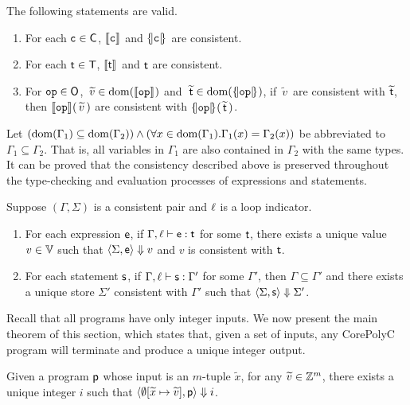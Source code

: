 \documentclass[runningheads]{llncs}
\begin{document}
\begin{lemma}\label{lem:map}
The following statements are valid.
\begin{enumerate}
    \item For each $\c\in\C$, $\smap{\c}{}$ and $\tmap{\c}{}$ are consistent.
    \item For each $\tt\in\T$, $\smap{\tt}{}$ and $\tt$ are consistent.
    \item For $\op\in\O$, $\,\widetilde{v}\in\dom(\smap{\op}{})$ and $\;\widetilde{\tt}\in\dom(\tmap{\op}{})$, if $\,\widetilde{v}\,$ are consistent with $\widetilde{\tt}$, then $\smap{\op}{}(\,\widetilde{v}\,)$ are consistent with $\tmap{\op}{}(\,\widetilde{\tt}\,)$.
\end{enumerate}
\end{lemma}


Let $\left(\dom(\Gamma_1)\subseteq\dom(\Gamma_2)\right) \wedge \left(\forall x\in\dom(\Gamma_1). \Gamma_1(x)=\Gamma_2(x)\right)$ be abbreviated to $\Gamma_1\subseteq\Gamma_2$.
That is, all variables in $\Gamma_1$ are also contained in $\Gamma_2$ with the same types.
It can be proved that the consistency described above is preserved throughout the type-checking and evaluation processes of expressions and statements.

\begin{lemma}
Suppose $(\Gamma,\Sigma)$ is a consistent pair and $\l$ is a loop indicator.
\begin{enumerate}
    \item For each expression $\e$, if $\typing{\Gamma}{\l}{\e}{\tt}$ for some $\tt$, there exists a unique value $v\in\V$ such that $\semantics{\Sigma}{\e}{v}$ and $v$ is consistent with $\tt$.
    \item For each statement $\s$, if $\typing{\Gamma}{\l}{\s}{\Gamma'}$ for some $\Gamma'$, then $\Gamma\subseteq\Gamma'$ and there exists a unique store $\Sigma'$ consistent with $\Gamma'$ such that $\semantics{\Sigma}{\s}{\Sigma'}$.
\end{enumerate}
\label{lem:preservation}
\end{lemma}

Recall that all programs have only integer inputs.
We now present the main theorem of this section, which states that, given a set of inputs, any CorePolyC program will terminate and produce a unique integer output.

\begin{theorem}
    Given a program $\p$ whose input is an $m$-tuple $\widetilde{x}$, for any $\widetilde{v}\in\Z^m$, there exists a unique integer $i$ such that $\semantics{\emptyset[\widetilde{x}\mapsto{\widetilde{v}}]}{\p}{i}$.
    \label{thm:safety}
\end{theorem}
\end{document}
